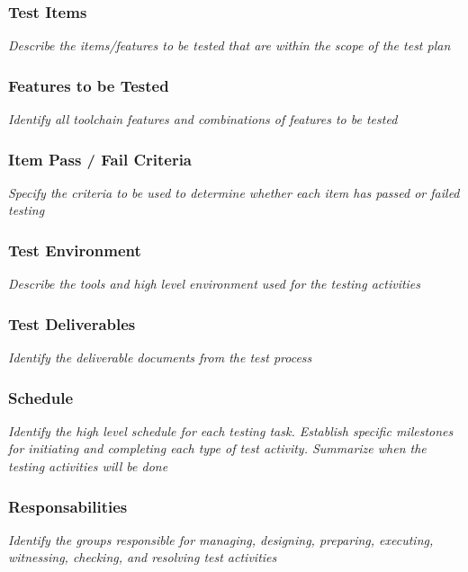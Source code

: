 \begin{appendices}
\subsubsection{Test Items}
\textit{Describe the items/features to be tested that are within the scope of the test plan}
\subsubsection{Features to be Tested}
\textit{Identify all toolchain features and combinations of features to be tested}
\subsubsection{Item Pass / Fail Criteria}
\textit{Specify the criteria to be used to determine whether each item has passed or failed testing}
\subsubsection{Test Environment}
\textit{Describe the tools and high level environment used for the testing activities}
\subsubsection{Test Deliverables}
\textit{Identify the deliverable documents from the test process}
\subsubsection{Schedule}
\textit{Identify the high level schedule for each testing task. Establish specific milestones for initiating and completing each type of test activity. Summarize when the testing activities will be done}
\subsubsection{Responsabilities}
\textit{Identify the groups responsible for managing, designing, preparing, executing, witnessing, checking, and resolving test activities}

\newpage

\end{appendices}
